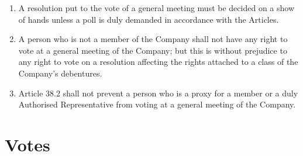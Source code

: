 \documentclass[a4paper,12pt]{article}
\begin{document}
\begin{enumerate}
  \item A resolution put to the vote of a general meeting must be decided on a show of hands unless a poll is duly demanded in accordance with the Articles.
  \item A person who is not a member of the Company shall not have any right to vote at a general meeting of the Company; but this is without prejudice to any right to vote on a resolution affecting the rights attached to a class of the Company’s debentures. %
  \item Article 38.2 shall not prevent a person who is a proxy for a member or a duly Authorised Representative from voting at a general meeting of the Company.
\end{enumerate}

\section{Votes}
\end{document}
